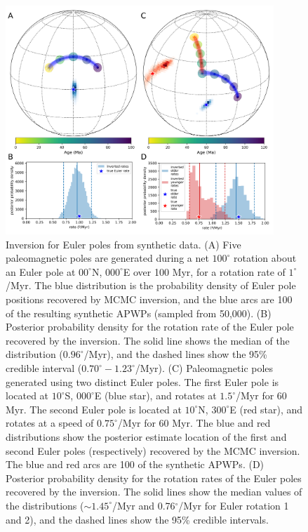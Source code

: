 \documentclass[11pt,letterpaper]{article}
\begin{document}
\begin{figure}
\centering
\includegraphics[width=0.9\textwidth]{fig_synthetic_pep.png}
\caption{Inversion for Euler poles from synthetic data. (A) Five paleomagnetic poles are generated during a net $100^\circ$ rotation about an Euler pole at $00^\circ$N, $000^\circ$E over 100 Myr, for a rotation rate of $1^\circ$/Myr. The blue distribution is the probability density of Euler pole positions recovered by MCMC inversion, and the blue arcs are 100 of the resulting synthetic APWPs (sampled from 50,000). (B) Posterior probability density for the rotation rate of the Euler pole recovered by the inversion. The solid line shows the median of the distribution ($0.96^\circ$/Myr), and the dashed lines show the 95\% credible interval ($0.70^\circ-1.23^\circ$/Myr). (C) Paleomagnetic poles generated using two distinct Euler poles. The first Euler pole is located at $10^\circ$S, $000^\circ$E (blue star), and rotates at $1.5^\circ$/Myr for 60 Myr. The second Euler pole is located at $10^\circ$N, $300^\circ$E (red star), and rotates at a speed of $0.75^\circ$/Myr for 60 Myr. The blue and red distributions show the posterior estimate location of the first and second Euler poles (respectively) recovered by the MCMC inversion. The blue and red arcs are 100 of the synthetic APWPs. (D) Posterior probability density for the rotation rates of the Euler poles recovered by the inversion. The solid lines show the median values of the distributions ($\sim 1.45^\circ$/Myr and 0.76$^\circ$/Myr for Euler rotation 1 and 2), and the dashed lines show the 95\% credible intervals.}
\label{fig:synthetic_pep}
\end{figure}
\end{document}
